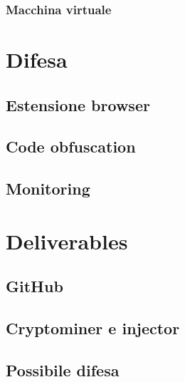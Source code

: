 \documentclass[11pt]{article}
\begin{document}
\subsubsection{Macchina virtuale}
\label{sec:org474f15a}
\section{Difesa}
\label{sec:org8779223}
\subsection{Estensione browser}
\label{sec:orgab5b60a}
\subsection{Code obfuscation}
\label{sec:orga39b81d}
\subsection{Monitoring}
\label{sec:org7f61844}
\section{Deliverables}
\label{sec:org6ac591c}
\subsection{GitHub}
\label{sec:orgfa5c559}
\subsection{Cryptominer e injector}
\label{sec:orgc8845cc}
\subsection{Possibile difesa}
\label{sec:org8286095}
\end{document}
